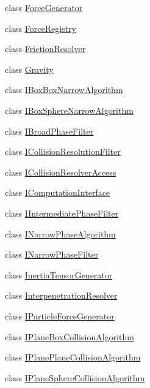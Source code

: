 \begin{DoxyCompactItemize}
class \mbox{\hyperlink{classr3_1_1_force_generator}{Force\+Generator}}
\item 
class \mbox{\hyperlink{classr3_1_1_force_registry}{Force\+Registry}}
\item 
class \mbox{\hyperlink{classr3_1_1_friction_resolver}{Friction\+Resolver}}
\item 
class \mbox{\hyperlink{classr3_1_1_gravity}{Gravity}}
\item 
class \mbox{\hyperlink{classr3_1_1_i_box_box_narrow_algorithm}{I\+Box\+Box\+Narrow\+Algorithm}}
\item 
class \mbox{\hyperlink{classr3_1_1_i_box_sphere_narrow_algorithm}{I\+Box\+Sphere\+Narrow\+Algorithm}}
\item 
class \mbox{\hyperlink{classr3_1_1_i_broad_phase_filter}{I\+Broad\+Phase\+Filter}}
\item 
class \mbox{\hyperlink{classr3_1_1_i_collision_resolution_filter}{I\+Collision\+Resolution\+Filter}}
\item 
class \mbox{\hyperlink{classr3_1_1_i_collision_resolver_access}{I\+Collision\+Resolver\+Access}}
\item 
class \mbox{\hyperlink{classr3_1_1_i_computation_interface}{I\+Computation\+Interface}}
\item 
class \mbox{\hyperlink{classr3_1_1_i_intermediate_phase_filter}{I\+Intermediate\+Phase\+Filter}}
\item 
class \mbox{\hyperlink{classr3_1_1_i_narrow_phase_algorithm}{I\+Narrow\+Phase\+Algorithm}}
\item 
class \mbox{\hyperlink{classr3_1_1_i_narrow_phase_filter}{I\+Narrow\+Phase\+Filter}}
\item 
class \mbox{\hyperlink{classr3_1_1_inertia_tensor_generator}{Inertia\+Tensor\+Generator}}
\item 
class \mbox{\hyperlink{classr3_1_1_interpenetration_resolver}{Interpenetration\+Resolver}}
\item 
class \mbox{\hyperlink{classr3_1_1_i_particle_force_generator}{I\+Particle\+Force\+Generator}}
\item 
class \mbox{\hyperlink{classr3_1_1_i_plane_box_collision_algorithm}{I\+Plane\+Box\+Collision\+Algorithm}}
\item 
class \mbox{\hyperlink{classr3_1_1_i_plane_plane_collision_algorithm}{I\+Plane\+Plane\+Collision\+Algorithm}}
\item 
class \mbox{\hyperlink{classr3_1_1_i_plane_sphere_collision_algorithm}{I\+Plane\+Sphere\+Collision\+Algorithm}}
\item 

\end{DoxyCompactItemize}
